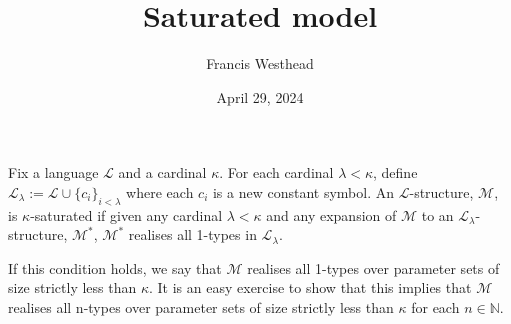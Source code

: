 \documentclass[a4paper]{article}
\title{Saturated model}
\date{April 29, 2024}
\author{Francis Westhead}
\begin{document}
\maketitle
\par{Fix a language \(\mathcal {L}\) and a cardinal \(\kappa\). For each cardinal \(\lambda  <  \kappa\), define \(\mathcal {L}_ \lambda  :=  \mathcal {L}  \cup   \{ c_i \} _{i< \lambda }\) where each \(c_i\) is a new constant symbol. An \(\mathcal {L}\)-structure, \(\mathcal {M}\), is \(\kappa\)-saturated if given any cardinal \(\lambda < \kappa\) and any expansion of \(\mathcal {M}\) to an \(\mathcal {L}_ \lambda\)-structure, \(\mathcal {M}^*\), \(\mathcal {M}^*\) realises all 1-types in \(\mathcal {L}_ \lambda\).}\par{If this condition holds, we say that \(\mathcal {M}\) realises all 1-types over parameter sets of size strictly less than \(\kappa\). It is an easy exercise to show that this implies that \(\mathcal {M}\) realises all n-types over parameter sets of size strictly less than \(\kappa\) for each \(n  \in   \mathbb {N}\).}
\printbibliography
\end{document}
